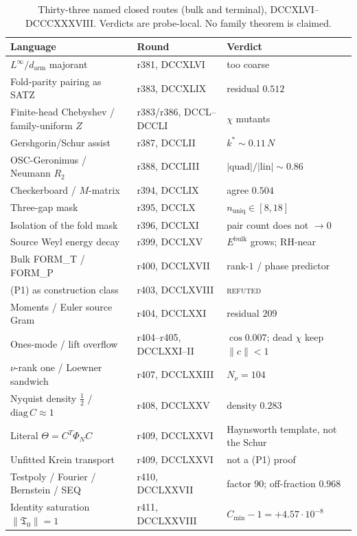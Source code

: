 \documentclass[11pt]{article}
\theoremstyle{remark}
\newcommand{\half}{\tfrac12}
\newcommand{\Tfrak}{\mathfrak{T}}
\begin{document}
\begin{table}[ht]
\centering
\caption{Thirty-three named closed routes (bulk and terminal),
DCCXLVI--DCCCXXXVIII.  Verdicts are probe-local.  No family
theorem is claimed.}
\label{tab:closed}
{\small
\begin{tabular}{@{}llp{5.4cm}@{}}
\toprule
Language & Round & Verdict \\
\midrule
$L^{\infty}/d_{\mathrm{arm}}$ majorant
  & r381, DCCXLVI & too coarse \\
Fold-parity pairing as SATZ
  & r383, DCCXLIX & residual $0.512$ \\
Finite-head Chebyshev / family-uniform $Z$
  & r383/r386, DCCL--DCCLI & $\chi$ mutants \\
Gershgorin/Schur assist
  & r387, DCCLII & $k^{*}\sim0.11\,N$ \\
OSC-Geronimus / Neumann $R_{2}$
  & r388, DCCLIII & $|\mathrm{quad}|/|\mathrm{lin}|\sim0.86$ \\
Checkerboard / $M$-matrix
  & r394, DCCLIX & agree $0.504$ \\
Three-gap mask
  & r395, DCCLX & $n_{\mathrm{uniq}}\in[8,18]$ \\
Isolation of the fold mask
  & r396, DCCLXI & pair count does not $\to0$ \\
Source Weyl energy decay
  & r399, DCCLXV & $E^{\mathrm{bulk}}$ grows; RH-near \\
Bulk FORM\_T / FORM\_P
  & r400, DCCLXVII & rank-$1$ / phase predictor \\
(P1) as construction class
  & r403, DCCLXVIII & \textsc{refuted} \\
Moments / Euler source Gram
  & r404, DCCLXXI & residual $209$ \\
Ones-mode / lift overflow
  & r404--r405, DCCLXXI--II & $\cos0.007$; dead $\chi$ keep $\|c\|<1$ \\
$\nu$-rank one / Loewner sandwich
  & r407, DCCLXXIII & $N_{\nu}=104$ \\
Nyquist density $\half$ / $\mathrm{diag}\,C\approx1$
  & r408, DCCLXXV & density $0.283$ \\
Literal $\Theta=C^{T}\Phi_{N}C$
  & r409, DCCLXXVI & Haynsworth template, not the Schur \\
Unfitted Krein transport
  & r409, DCCLXXVI & not a (P1) proof \\
Testpoly / Fourier / Bernstein / SEQ
  & r410, DCCLXXVII & factor $90$; off-fraction $0.968$ \\
Identity saturation $\|\Tfrak_{0}\|=1$
  & r411, DCCLXXVIII & $C_{\min}-1=+4.57\cdot10^{-8}$ \\

\end{tabular}}
\end{table}
\end{document}
